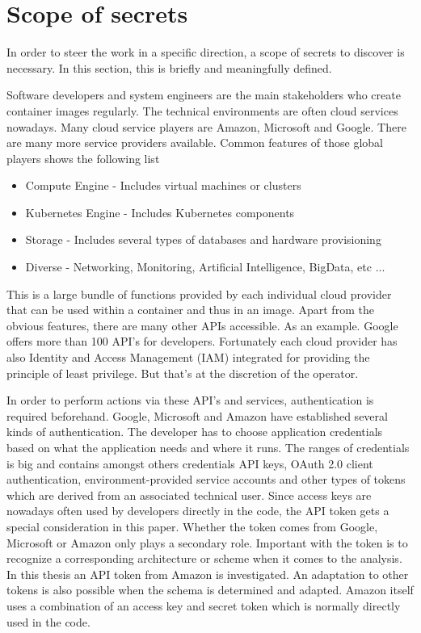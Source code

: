 \section{Scope of secrets}
\label{ch:theory:scope_secrets}
In order to steer the work in a specific direction, a scope of secrets to discover is necessary. In this section, this is briefly and meaningfully defined.

Software developers and system engineers are the main stakeholders who create container images regularly. The technical environments are often cloud services nowadays. Many cloud service players are Amazon, Microsoft and Google. There are many more service providers available. Common features of those global players shows the following list
\begin{itemize}
\item Compute Engine - Includes virtual machines or clusters
\item Kubernetes Engine - Includes Kubernetes components
\item Storage - Includes several types of databases and hardware provisioning
\item Diverse - Networking, Monitoring, Artificial Intelligence, BigData, etc ...
\end{itemize}

This is a large bundle of functions provided by each individual cloud provider that can be used within a container and thus in an image.
Apart from the obvious features, there are many other APIs accessible. As an example. Google offers more than 100 API's for developers.
Fortunately each cloud provider has also Identity and Access Management (IAM) integrated for providing the principle of least privilege. But that's at the discretion of the operator.

In order to perform actions via these API's and services, authentication is required beforehand. Google, Microsoft and Amazon have established several kinds of authentication. 
The developer has to choose application credentials based on what the application needs and where it runs.
The ranges of credentials is big and contains amongst others credentials API keys, OAuth 2.0 client authentication, environment-provided service accounts and other types of tokens which are derived from an associated technical user.
Since access keys are nowadays often used by developers directly in the code, the API token gets a special consideration in this paper.
Whether the token comes from Google, Microsoft or Amazon only plays a secondary role. Important with the token is to recognize a corresponding architecture or scheme when it comes to the analysis.
In this thesis an API token from Amazon is investigated. An adaptation to other tokens is also possible when the schema is determined and adapted.
Amazon itself uses a combination of an access key and secret token which is normally directly used in the code.

